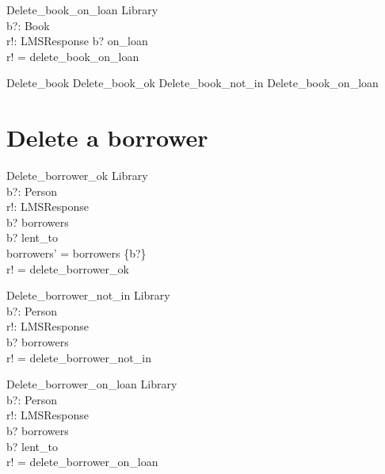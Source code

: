 \documentclass[11pt, fuzz]{article}
\begin{document}
\begin{schema}{Delete\_book\_on\_loan}
    \Xi Library     \\
    b?: Book        \\
    r!: LMSResponse
\where
    b? \in on\_loan             \\
    r! = delete\_book\_on\_loan \\
\end{schema}

\begin{zed}
    Delete\_book  Delete\_book\_ok \lor Delete\_book\_not\_in \lor Delete\_book\_on\_loan
\end{zed}


\section{Delete a borrower}


\begin{schema}{Delete\_borrower\_ok}
    \Delta Library  \\
    b?: Person      \\
    r!: LMSResponse \\
\where
    b? \in borrowers                        \\
    b? \notin \ran lent\_to                 \\
    borrowers' = borrowers \setminus \{b?\} \\
    r! = delete\_borrower\_ok               \\
\end{schema}

\begin{schema}{Delete\_borrower\_not\_in}
    \Xi Library     \\
    b?: Person      \\
    r!: LMSResponse \\
\where
    b? \notin borrowers            \\
    r! = delete\_borrower\_not\_in \\
\end{schema}

\begin{schema}{Delete\_borrower\_on\_loan}
    \Xi Library     \\
    b?: Person      \\
    r!: LMSResponse \\
\where
    b? \in borrowers                        \\
    b? \in \ran lent\_to                    \\
    r! = delete\_borrower\_on\_loan         \\
\end{schema}
\end{document}
